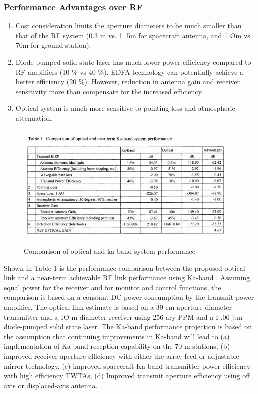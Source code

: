 \subsubsection{Performance Advantages over RF}

\begin{enumerate}
	\item Cost consideration limits the aperture diameters to be much smaller than that of the RF system (0.3 m vs. 1 .5m for spacecraft antenna, and 1 Om vs. 70m for ground station). 
	\item Diode-pumped solid state laser has much lower power efficiency compared to RF amplifiers (10 \% vs 40 \%). EDFA technology can potentially achieve a better efficiency (20 \%). However, reduction in antenna gain and receiver sensitivity more than compensate for the increased efficiency. 
	\item Optical system is much more sensitive to pointing loss and atmospheric attenuation.
\end{enumerate}

\begin{figure}[htb]
\begin{center}
\includegraphics[width=1\columnwidth]{figures/laser-communication/bh3.jpg}
\caption{Comparison of optical and ka-band system performance}
\end{center}
\end{figure}
\noindent
Shown in Table 1 is the performance comparison between the proposed optical link and a near-term achievable RF link performance using Ka-band \cite{comparison}. Assuming equal power for the receiver and for monitor and control functions, the comparison is based on a constant DC power consumption by the transmit power amplifier. The optical link estimate is based on a 30 cm aperture diameter transmitter and a 1O m diameter receiver using 256-ary PPM and a I .06 jtm diode-pumped solid state laser. The Ka-band performance projection is based on the assumption that continuing improvements in Ka-band will lead to 
(a) implementation of Ka-band reception capability on the 70 m stations,
 (b) improved receiver aperture efficiency with either
the array feed or adjustable mirror technology, 
(c) improved spacecraft Ka-band transmitter power efficiency with high efficiency TWTAs, 
(d) Improved transmit aperture efficiency using off axis or displaced-axis antenna.

